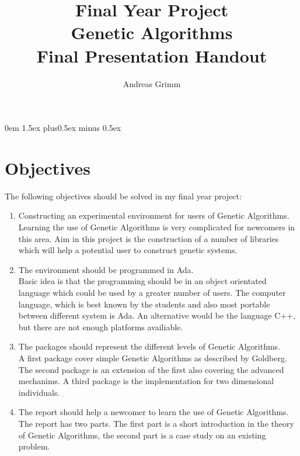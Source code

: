 \title{{Final Year Project\\
Genetic Algorithms\\
Final Presentation Handout}}
\author{Andreas Grimm}
\frenchspacing
\def\bs{\char'134 } %
\pagestyle{headings}
\parindent0em \parskip1.5ex plus0.5ex minus 0.5ex
\renewcommand{\baselinestretch}{1.5}

\maketitle
\tableofcontents
\newpage
\section{Objectives}
The following objectives should be solved in my final year project:
\begin{enumerate}
\item Constructing an experimental environment for users of Genetic Algorithms.\\
Learning the use of Genetic Algorithms is very complicated for newcomers in this
area. Aim in this project is the construction of a number of libraries which
will help a potential user to construct genetic systems.
\item The environment should be programmed in Ada.\\
Basic idea is that the programming should be in an object orientated language which could be used
by a greater number of users. The computer language, which is best known by the
students and also most portable between different system is Ada. An alternative
would be the language C++, but there are not enough platforms availiable.
\item The packages should represent the different levels of Genetic Algorithms.\\
A first package cover simple Genetic Algorithms as described by Goldberg\cite{Gol89}.
The second package is an extension of the first also covering the advanced mechanims.
A third package is the implementation for two dimensional individuals.
\item The report should help a newcomer to learn the use of Genetic Algorithms.\\
The report has two parts. The first part is a short introduction in the theory
of Genetic Algorithms, the second part is a case study on an existing problem. 
\end{enumerate}

